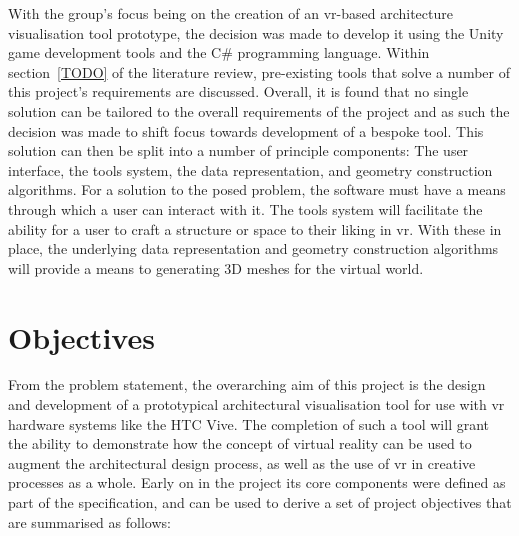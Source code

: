     With the group's focus being on the creation of an \acrshort{vr}-based architecture visualisation tool prototype, the decision was made to develop it using the Unity game development tools and the C\# programming language. Within section~\ref{TODO} of the literature review, pre-existing tools that solve a number of this project's requirements are discussed. Overall, it is found that no single solution can be tailored to the overall requirements of the project and as such the decision was made to shift focus towards development of a bespoke tool. This solution can then be split into a number of principle components: The user interface, the tools system, the data representation, and geometry construction algorithms. For a solution to the posed problem, the software must have a means through which a user can interact with it. The tools system will facilitate the ability for a user to craft a structure or space to their liking in \acrshort{vr}. With these in place, the underlying data representation and geometry construction algorithms will provide a means to generating 3D meshes for the virtual world.

\section{Objectives}

    From the problem statement, the overarching aim of this project is the design and development of a prototypical architectural visualisation tool for use with \acrshort{vr} hardware systems like the HTC Vive. The completion of such a tool will grant the ability to demonstrate how the concept of virtual reality can be used to augment the architectural design process, as well as the use of \acrshort{vr} in creative processes as a whole. Early on in the project its core components were defined as part of the specification, and can be used to derive a set of project objectives that are summarised as follows:
    
